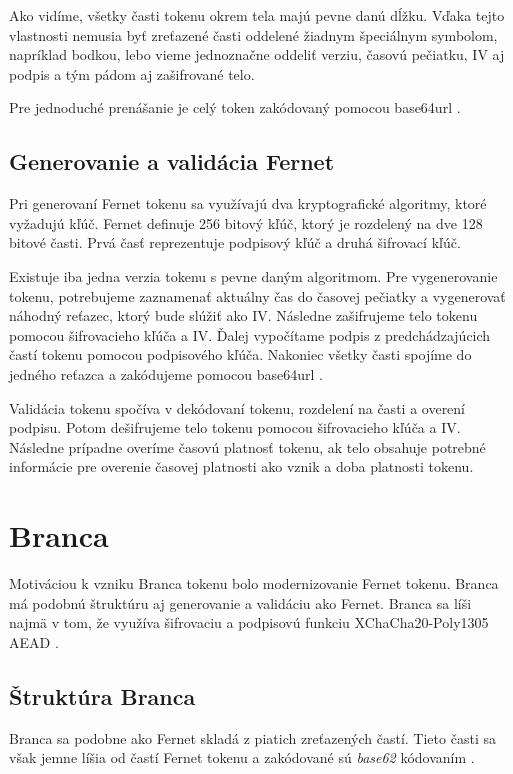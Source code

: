 Ako vidíme, všetky časti tokenu okrem tela majú pevne danú dĺžku. Vďaka tejto vlastnosti nemusia byť zreťazené časti oddelené žiadnym špeciálnym symbolom, napríklad bodkou, lebo vieme jednoznačne oddeliť verziu, časovú pečiatku, IV aj podpis a tým pádom aj zašifrované telo.

Pre jednoduché prenášanie je celý token zakódovaný pomocou base64url \cite{base64_rfc}.

\subsection{Generovanie a validácia Fernet}

Pri generovaní Fernet tokenu sa využívajú dva kryptografické algoritmy, ktoré vyžadujú kľúč. Fernet definuje 256 bitový kľúč, ktorý je rozdelený na dve 128 bitové časti. Prvá časť reprezentuje podpisový kľúč a druhá šifrovací kľúč.

Existuje iba jedna verzia tokenu s pevne daným algoritmom. Pre vygenerovanie tokenu, potrebujeme zaznamenať aktuálny čas do časovej pečiatky a vygenerovať náhodný reťazec, ktorý bude slúžiť ako IV. Následne zašifrujeme telo tokenu pomocou šifrovacieho kľúča a IV. Ďalej vypočítame podpis z predchádzajúcich častí tokenu pomocou podpisového kľúča. Nakoniec všetky časti spojíme do jedného reťazca a zakódujeme pomocou base64url \cite{base64_rfc}.

Validácia tokenu spočíva v dekódovaní tokenu, rozdelení na časti a overení podpisu. Potom dešifrujeme telo tokenu pomocou šifrovacieho kľúča a IV. Následne prípadne overíme časovú platnosť tokenu, ak telo obsahuje potrebné informácie pre overenie časovej platnosti ako vznik a doba platnosti tokenu.

\section{Branca}

Motiváciou k vzniku Branca tokenu bolo modernizovanie Fernet tokenu. Branca má podobnú štruktúru aj generovanie a validáciu ako Fernet. Branca sa líši najmä v tom, že využíva šifrovaciu a podpisovú funkciu XChaCha20-Poly1305 AEAD \cite{chacha_poly}.

\subsection{Štruktúra Branca}

Branca sa podobne ako Fernet skladá z piatich zreťazených častí. Tieto časti sa však jemne líšia od častí Fernet tokenu a zakódované sú \textit{base62} kódovaním \cite{base62}.

